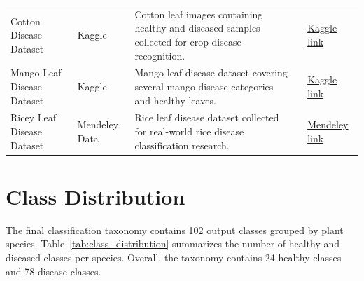 {\begin{longtable}{@{}L{2.8cm} L{1.8cm} L{5.0cm} L{1.7cm} L{3.7cm}@{}}
Cotton Disease Dataset & Kaggle & Cotton leaf images containing healthy and diseased samples collected for crop disease recognition. & \cite{dataset_cotton_kaggle} & \href{https://www.kaggle.com/datasets/janmejaybhoi/cotton-disease-dataset}{Kaggle link} \\
Mango Leaf Disease Dataset & Kaggle & Mango leaf disease dataset covering several mango disease categories and healthy leaves. & \cite{dataset_mango_kaggle} & \href{https://www.kaggle.com/datasets/aryashah2k/mango-leaf-disease-dataset}{Kaggle link} \\
Ricey Leaf Disease Dataset & Mendeley Data & Rice leaf disease dataset collected for real-world rice disease classification research. & \cite{dataset_ricey_mendeley} & \href{https://data.mendeley.com/datasets/t46kkgh2yw/1}{Mendeley link} \\
\end{longtable}
}

\section{Class Distribution}
\label{sec:app_class_distribution}

The final classification taxonomy contains 102 output classes grouped by plant species. Table~\ref{tab:class_distribution} summarizes the number of healthy and diseased classes per species. Overall, the taxonomy contains 24 healthy classes and 78 disease classes.

